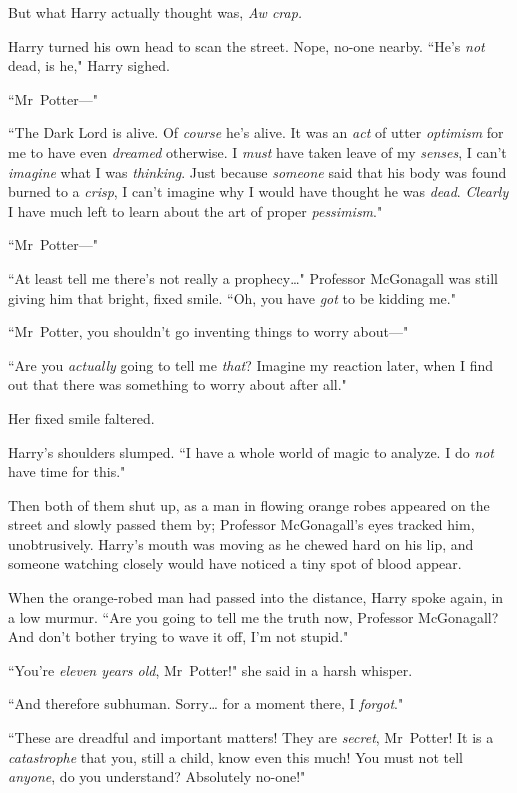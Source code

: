 But what Harry actually thought was, \emph{Aw crap.}

Harry turned his own head to scan the street. Nope, no-one nearby. ``He's \emph{not} dead, is he," Harry sighed.

``Mr~Potter—"

``The Dark Lord is alive. Of \emph{course} he's alive. It was an \emph{act} of utter \emph{optimism} for me to have even \emph{dreamed} otherwise. I \emph{must} have taken leave of my \emph{senses}, I can't \emph{imagine} what I was \emph{thinking}. Just because \emph{someone} said that his body was found burned to a \emph{crisp}, I can't imagine why I would have thought he was \emph{dead}. \emph{Clearly} I have much left to learn about the art of proper \emph{pessimism}."

``Mr~Potter—"

``At least tell me there's not really a prophecy{\ldots}" Professor McGonagall was still giving him that bright, fixed smile. ``Oh, you have \emph{got} to be kidding me."

``Mr~Potter, you shouldn't go inventing things to worry about—"

``Are you \emph{actually} going to tell me \emph{that}? Imagine my reaction later, when I find out that there was something to worry about after all."

Her fixed smile faltered.

Harry's shoulders slumped. ``I have a whole world of magic to analyze. I do \emph{not} have time for this."

Then both of them shut up, as a man in flowing orange robes appeared on the street and slowly passed them by; Professor McGonagall's eyes tracked him, unobtrusively. Harry's mouth was moving as he chewed hard on his lip, and someone watching closely would have noticed a tiny spot of blood appear.

When the orange-robed man had passed into the distance, Harry spoke again, in a low murmur. ``Are you going to tell me the truth now, Professor McGonagall? And don't bother trying to wave it off, I'm not stupid."

``You're \emph{eleven years old}, Mr~Potter!" she said in a harsh whisper.

``And therefore subhuman. Sorry{\ldots} for a moment there, I \emph{forgot}."

``These are dreadful and important matters! They are \emph{secret}, Mr~Potter! It is a \emph{catastrophe} that you, still a child, know even this much! You must not tell \emph{anyone}, do you understand? Absolutely no-one!"

